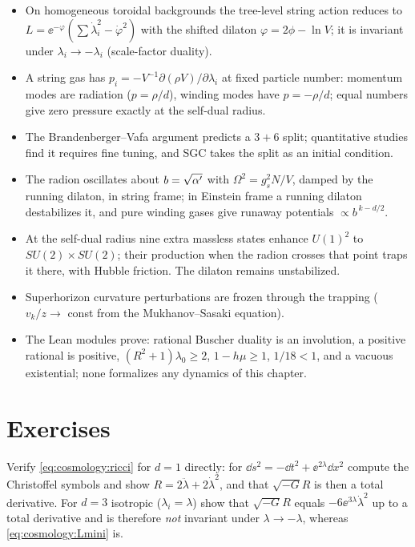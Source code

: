 \begin{summarybox}
\begin{itemize}[leftmargin=*,itemsep=1pt]
\item On homogeneous toroidal backgrounds the tree-level string action reduces to
 $L=\ee^{-\varphi}(\sum\dot\lambda_i^2-\dot\varphi^2)$ with the shifted dilaton
 $\varphi=2\phi-\ln V$; it is invariant under $\lambda_i\to-\lambda_i$ (scale-factor duality).
\item A string gas has $p_i=-V^{-1}\partial(\rho V)/\partial\lambda_i$ at fixed particle
 number: momentum modes are radiation ($p=\rho/d$), winding modes have $p=-\rho/d$; equal
 numbers give zero pressure exactly at the self-dual radius.
\item The Brandenberger--Vafa argument predicts a $3+6$ split; quantitative studies find it
 requires fine tuning, and SGC takes the split as an initial condition.
\item The radion oscillates about $b=\sqrt{\alpha'}$ with $\Omega^2=g_s^2N/V$, damped by the
 running dilaton, in string frame; in Einstein frame a running dilaton destabilizes it, and
 pure winding gases give runaway potentials $\propto b^{\,k-d/2}$.
\item At the self-dual radius nine extra massless states enhance $U(1)^2$ to
 $SU(2)\times SU(2)$; their production when the radion crosses that point traps it there,
 with Hubble friction. The dilaton remains unstabilized.
\item Superhorizon curvature perturbations are frozen through the trapping
 ($v_k/z\to$ const from the Mukhanov--Sasaki equation).
\item The Lean modules prove: rational Buscher duality is an involution, a positive rational
 is positive, $(R^2+1)\lambda_0\ge2$, $1-h\mu\ge1$, $1/18<1$, and a vacuous existential;
 none formalizes any dynamics of this chapter.
\end{itemize}
\end{summarybox}

\section*{Exercises}

\begin{exercise}[$\star$]
Verify \eqref{eq:cosmology:ricci} for $d=1$ directly: for $\dd s^2=-\dd t^2+\ee^{2\lambda}\dd x^2$
compute the Christoffel symbols and show $R=2\ddot\lambda+2\dot\lambda^2$, and that
$\sqrt{-G}R$ is then a total derivative. For $d=3$ isotropic ($\lambda_i=\lambda$) show that
$\sqrt{-G}R$ equals $-6\ee^{3\lambda}\dot\lambda^2$ up to a total derivative and is therefore
\emph{not} invariant under $\lambda\to-\lambda$, whereas \eqref{eq:cosmology:Lmini} is.
\end{exercise}

